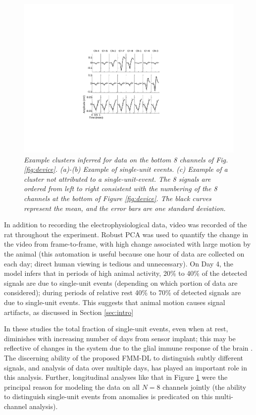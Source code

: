 \documentclass[journal]{IEEEtran}
\begin{document}
\begin{figure}[h!]
  \centering
    \includegraphics[width=1.0\linewidth]{figs_new/singleunits.pdf}
\caption{\label{fig:units}\small{\emph{Example
clusters inferred for data on the bottom 8 channels of Fig.
\ref{fig:device}. (a)-(b) Example of single-unit events. (c) Example
of a cluster \emph{not} attributed to a single-unit-event. The 8
signals are ordered from left to right consistent with the numbering
of the 8 channels at the bottom of Figure \ref{fig:device}. The black curves represent the mean, and the error bars are one standard deviation.}}}
\label{fig:units}
\end{figure}
In addition to recording the electrophysiological data, video was recorded of the rat throughout{ the experiment}. Robust PCA \cite{Wright09} was used to quantify the change in the video from frame-to-frame, with high change associated with large motion by the animal (this automation is {useful} because one hour of data are collected on each day; direct human viewing is tedious and unnecessary). On Day 4, the model infers that in periods of high animal activity, 20\% to 40\% of the detected signals are due to single-unit events (depending on which portion of data are considered); during periods of relative rest 40\% to 70\% of detected signals are due to single-unit events. This suggests that animal motion causes signal artifacts, as discussed in Section \ref{sec:intro}


In these studies the total fraction of single-unit events, even when at rest, diminishes with increasing number of days from sensor implant; this may be reflective of changes in the system due to the glial immune response of the brain \cite{Biran,Szarowski03}. The discerning ability of the proposed FMM{-DL} to distinguish subtly different signals, and analysis of data over multiple days, has played an important role in this analysis. Further, {longitudinal} analyses like that in Figure \ref{fig:units} were the principal reason for modeling the data on all $N=8$ channels jointly (the ability to distinguish single-unit events from anomalies is predicated on this multi-channel analysis).
\end{document}
